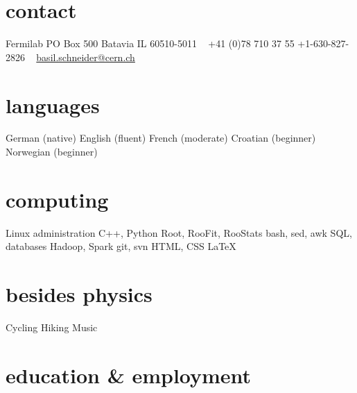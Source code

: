 \documentclass[]{cv} %
\begin{document}


\begin{aside} %
  \section{contact}
  Fermilab
  PO Box 500
  Batavia IL 60510-5011
  ~
  +41 (0)78 710 37 55
  +1-630-827-2826
  ~
  \href{mailto:basil.schneider@cern.ch}{basil.schneider@cern.ch}
  \section{languages}
  German (native)
  English (fluent)
  French (moderate)
  Croatian (beginner)
  Norwegian (beginner)
  \section{computing}
  Linux administration
  C++, Python
  Root, RooFit, RooStats
  bash, sed, awk
  SQL, databases
  Hadoop, Spark
  git, svn
  HTML, CSS
  \LaTeX
  \section{besides physics}
  Cycling
  Hiking
  Music
\end{aside}


\section{education \& employment}
\end{document}
